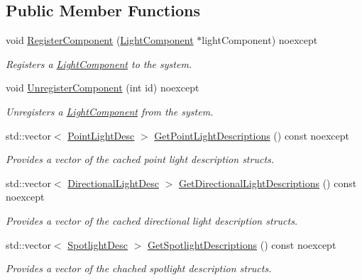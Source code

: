 \subsection*{Public Member Functions}
\begin{DoxyCompactItemize}
\item 
void \hyperlink{class_blade_1_1_light_system_a0d98342c2927dd165f41ccb50d4845ab}{Register\+Component} (\hyperlink{class_blade_1_1_light_component}{Light\+Component} $\ast$light\+Component) noexcept
\begin{DoxyCompactList}\small\item\em Registers a \hyperlink{class_blade_1_1_light_component}{Light\+Component} to the system. \end{DoxyCompactList}\item 
void \hyperlink{class_blade_1_1_light_system_a7f7a3500b1177ebde379b7fd54b3d16a}{Unregister\+Component} (int id) noexcept
\begin{DoxyCompactList}\small\item\em Unregisters a \hyperlink{class_blade_1_1_light_component}{Light\+Component} from the system. \end{DoxyCompactList}\item 
std\+::vector$<$ \hyperlink{struct_blade_1_1_point_light_desc}{Point\+Light\+Desc} $>$ \hyperlink{class_blade_1_1_light_system_ad42bb7397b56bd224d53425f79c0a63b}{Get\+Point\+Light\+Descriptions} () const noexcept
\begin{DoxyCompactList}\small\item\em Provides a vector of the cached point light description structs. \end{DoxyCompactList}\item 
std\+::vector$<$ \hyperlink{struct_blade_1_1_directional_light_desc}{Directional\+Light\+Desc} $>$ \hyperlink{class_blade_1_1_light_system_a9efaf399620fc75c86fd6032b9291651}{Get\+Directional\+Light\+Descriptions} () const noexcept
\begin{DoxyCompactList}\small\item\em Provides a vector of the cached directional light description structs. \end{DoxyCompactList}\item 
std\+::vector$<$ \hyperlink{struct_blade_1_1_spotlight_desc}{Spotlight\+Desc} $>$ \hyperlink{class_blade_1_1_light_system_ace130c5e66ef2459a8dba36ea448124c}{Get\+Spotlight\+Descriptions} () const noexcept
\begin{DoxyCompactList}\small\item\em Provides a vector of the chached spotlight description structs. \end{DoxyCompactList}\item 

\end{DoxyCompactItemize}
